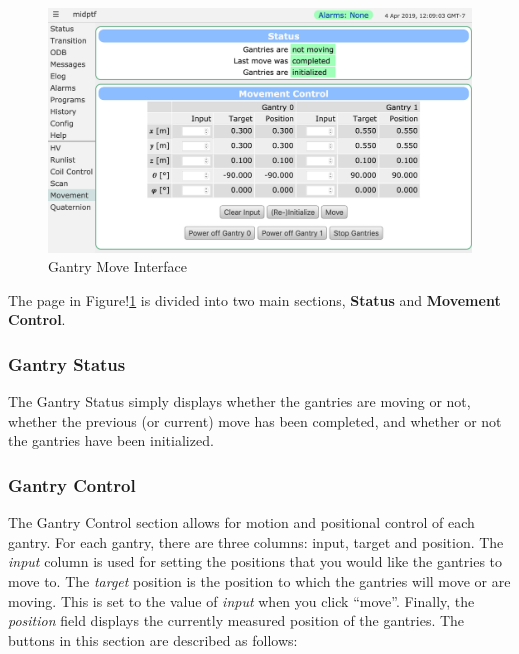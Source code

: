 \documentclass[twoside,letterpaper]{refart}
\begin{document}
\begin{figure}[!htpb]\centering	
	\includegraphics[width=\textwidth]{images/movement.png}
	\caption{Gantry Move Interface\label{gMove}}
\end{figure}

\FloatBarrier

The page in Figure!\ref{gMove} is divided into two main sections, \textbf{Status} and \textbf{Movement Control}.

\subsubsection{Gantry Status}
The Gantry Status simply displays whether the gantries are moving or not, whether the previous (or current) move has been completed, and whether or not the gantries have been initialized.

\subsubsection{Gantry Control}\label{GantryMove}

The Gantry Control section allows for motion and positional control of each gantry. For each gantry, there are three columns: input, target and position. The \emph{input} column is used for setting the positions that you would like the gantries to move to. The \emph{target} position is the position to which the gantries will move or are moving. This is set to the value of \emph{input} when you click ``move''. Finally, the \emph{position} field displays the currently measured position of the gantries. The buttons in this section are described as follows:
\end{document}
